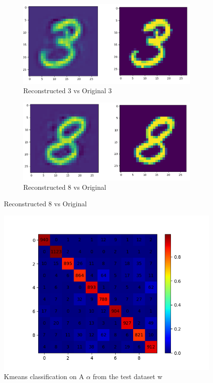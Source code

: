  \begin{figure}[h]
 \begin{subfigure}{.5\textwidth}
 \centering
 \includegraphics[scale=0.29]{../Results/LC-KSVD_X_ALL_K_1024/3_recons.png}
  \caption{Reconstructed 3 vs Original 3}
 \end{subfigure}%
  \begin{subfigure}{.3\textwidth}
 \centering
 \includegraphics[scale=0.29]{../Results/LC-KSVD_X_ALL_K_1024/8_recons.png}
  \caption{Reconstructed 8 vs Original }

 \end{subfigure}%
\end{figure}

\begin{figure}[h!]
 \centering
 \includegraphics[scale=0.72]{../Results/LC-KSVD_X_ALL_K_1024/confusion_matrix_test.png}
 \caption{Kmeans classification on A $\alpha$ from the test dataset w}
\end{figure}
